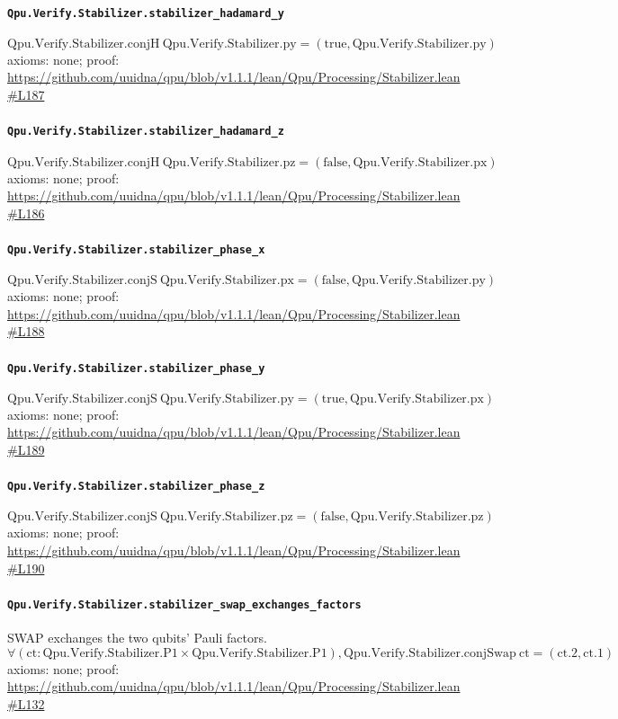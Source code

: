 \documentclass[11pt]{article}
\begin{document}
\paragraph{\texttt{Qpu.Verify.Stabilizer.stabilizer\_hadamard\_y}}
\[ \mathrm{Qpu.Verify.Stabilizer.conjH}\ \mathrm{Qpu.Verify.Stabilizer.py} = (\mathrm{true}, \mathrm{Qpu.Verify.Stabilizer.py}) \]
\noindent axioms: none; proof: \url{https://github.com/uuidna/qpu/blob/v1.1.1/lean/Qpu/Processing/Stabilizer.lean\#L187}

\paragraph{\texttt{Qpu.Verify.Stabilizer.stabilizer\_hadamard\_z}}
\[ \mathrm{Qpu.Verify.Stabilizer.conjH}\ \mathrm{Qpu.Verify.Stabilizer.pz} = (\mathrm{false}, \mathrm{Qpu.Verify.Stabilizer.px}) \]
\noindent axioms: none; proof: \url{https://github.com/uuidna/qpu/blob/v1.1.1/lean/Qpu/Processing/Stabilizer.lean\#L186}

\paragraph{\texttt{Qpu.Verify.Stabilizer.stabilizer\_phase\_x}}
\[ \mathrm{Qpu.Verify.Stabilizer.conjS}\ \mathrm{Qpu.Verify.Stabilizer.px} = (\mathrm{false}, \mathrm{Qpu.Verify.Stabilizer.py}) \]
\noindent axioms: none; proof: \url{https://github.com/uuidna/qpu/blob/v1.1.1/lean/Qpu/Processing/Stabilizer.lean\#L188}

\paragraph{\texttt{Qpu.Verify.Stabilizer.stabilizer\_phase\_y}}
\[ \mathrm{Qpu.Verify.Stabilizer.conjS}\ \mathrm{Qpu.Verify.Stabilizer.py} = (\mathrm{true}, \mathrm{Qpu.Verify.Stabilizer.px}) \]
\noindent axioms: none; proof: \url{https://github.com/uuidna/qpu/blob/v1.1.1/lean/Qpu/Processing/Stabilizer.lean\#L189}

\paragraph{\texttt{Qpu.Verify.Stabilizer.stabilizer\_phase\_z}}
\[ \mathrm{Qpu.Verify.Stabilizer.conjS}\ \mathrm{Qpu.Verify.Stabilizer.pz} = (\mathrm{false}, \mathrm{Qpu.Verify.Stabilizer.pz}) \]
\noindent axioms: none; proof: \url{https://github.com/uuidna/qpu/blob/v1.1.1/lean/Qpu/Processing/Stabilizer.lean\#L190}

\paragraph{\texttt{Qpu.Verify.Stabilizer.stabilizer\_swap\_exchanges\_factors}}
SWAP exchanges the two qubits' Pauli factors.
\[ \forall (\mathrm{ct} : \mathrm{Qpu.Verify.Stabilizer.P1} \times \mathrm{Qpu.Verify.Stabilizer.P1}), \mathrm{Qpu.Verify.Stabilizer.conjSwap}\ \mathrm{ct} = (\mathrm{ct.2}, \mathrm{ct.1}) \]
\noindent axioms: none; proof: \url{https://github.com/uuidna/qpu/blob/v1.1.1/lean/Qpu/Processing/Stabilizer.lean\#L132}
\end{document}
